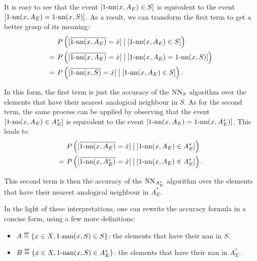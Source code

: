 {It is easy to see that the event $[\nn(x, A_E) \in S]$ is equivalent to
the event $[\nn(x, A_E) = \nn(x, S)]$. As a result, we can transform the first
term to get a better grasp of its meaning:
\begin{align*}
  &P\left([\albl{\nn(x, A_E)} = \dot{x}] \given[\big] [\nn(x, A_E) \in S] \right)\\
  =~ &P\left([\albl{\nn(x, A_E)} = \dot{x}] \given[\big] [\nn(x, A_E) = \nn(x,
  S)]\right)\\
  =~ &P\left([\albl{\nn(x, S)} = \dot{x}] \given[\big] [\nn(x, A_E) \in S]\right).
\end{align*}

In this form, the first term is just the accuracy of the $\NN_S$ algorithm over
the elements that have their nearest analogical neighbour in $S$.
As for the second term, the same process can be applied by observing that the
event $[\nn(x, A_E) \in A_E^*]$ is equivalent to the event $[\nn(x, A_E) = \nn(x,
A_E^*)]$. This leads to
\begin{align*}
  &P\left([\albl{\nn(x, A_E)} = \dot{x}] \given[\big] [\nn(x, A_E) \in
A_E^*]\right)\\
  =~ &P\left([\albl{\nn(x, A_E^*)} = \dot{x}] \given[\big] [\nn(x, A_E) \in
A_E^*]\right).
\end{align*}

This second term is then the accuracy of the $\NN_{A_E^*}$ algorithm over the elements
that have their nearest analogical neighbour in $A_E^*$.

In the light of these interpretations, one can rewrite the accuracy formula in
a  concise form, using a few more definitions:
\begin{itemize}
\item $A \eqdef \{x \in X, \nan(x, S) \in S\}$: the elements that have
  their nan in $S$.
\item $B \eqdef \{x \in X, \nan(x, S) \in A_E^*\}$: the elements that have
  their nan in $A_E^*$.
\end{itemize}

}
